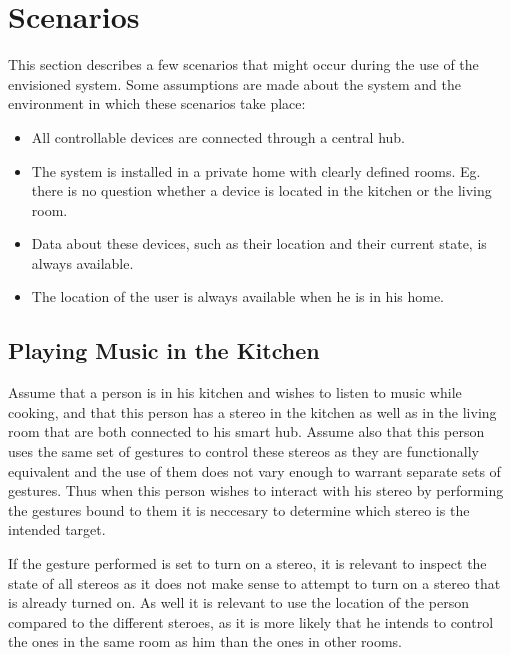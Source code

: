 \section{Scenarios}
\label{sec:analysis:scenarios}


This section describes a few scenarios that might occur during the use of the envisioned system. Some assumptions are made about the system and the environment in which these scenarios take place:

\begin{itemize}
    \item All controllable devices are connected through a central hub.
    \item The system is installed in a private home with clearly defined rooms. Eg. there is no question whether a device is located in the kitchen or the living room.
    \item Data about these devices, such as their location and their current state, is always available.
    \item The location of the user is always available when he is in his home.
\end{itemize}

\subsection{Playing Music in the Kitchen}
\label{sec:analysis:scenarios:playing_music}

Assume that a person is in his kitchen and wishes to listen to music while cooking, and that this person has a stereo in the kitchen as well as in the living room that are both connected to his smart hub.
Assume also that this person uses the same set of gestures to control these stereos as they are functionally equivalent and the use of them does not vary enough to warrant separate sets of gestures.
Thus when this person wishes to interact with his stereo by performing the gestures bound to them it is neccesary to determine which stereo is the intended target.

If the gesture performed is set to turn on a stereo, it is relevant to inspect the state of all stereos as it does not make sense to attempt to turn on a stereo that is already turned on.
As well it is relevant to use the location of the person compared to the different steroes, as it is more likely that he intends to control the ones in the same room as him than the ones in other rooms.

